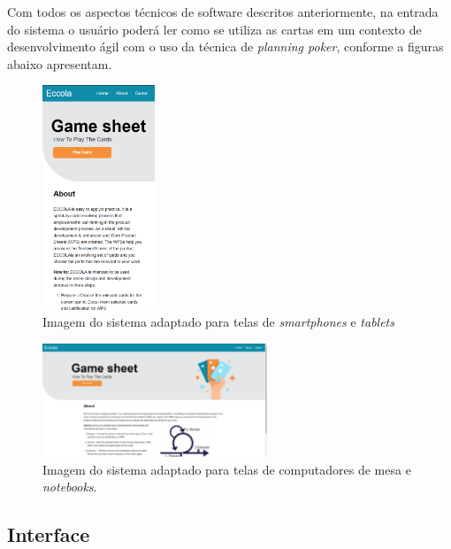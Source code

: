 Com todos os aspectos técnicos de software descritos anteriormente, na entrada do sistema o usuário poderá ler como se utiliza as cartas em um contexto de desenvolvimento ágil com o uso da técnica de \textit{planning poker}, conforme a figuras abaixo apresentam.

\begin{figure}[h!]
    \centering
    \includegraphics[width=0.3\textwidth]{img/eccola_celular.png}
    \caption{Imagem do sistema adaptado para telas de \textit{smartphones} e \textit{tablets}}
    \label{fig:eccola_celular}
\end{figure}

\begin{figure}[h!]
    \centering
    \includegraphics[width=0.6\textwidth]{img/eccola_desktop.png}
    \caption{Imagem do sistema adaptado para telas de computadores de mesa e \textit{notebooks}.}
    \label{fig:eccola_desktop}
\end{figure}

\subsection{Interface}



